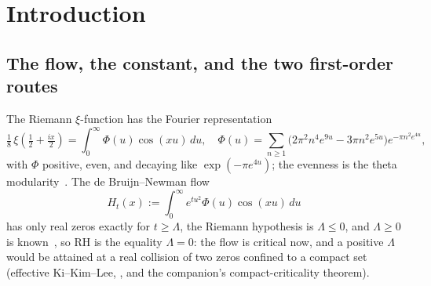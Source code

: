 \documentclass[11pt,reqno]{amsart}
\theoremstyle{plain}
\theoremstyle{definition}
\theoremstyle{remark}
\newcommand{\E}{\mathbb E}
\newcommand{\Mcal}{\mathcal M}
\DeclareMathOperator{\sgn}{sgn}
\begin{document}
\begin{abstract}
confirm the oscillation: at the surrogate collision sites
$x_*=2\gamma_1\approx28.27$ and $x_*=2\gamma_3\approx50.02$ the velocity
sign $\sgn(-M_m/M_1)$ reverses four and six times across $m\le30$, faster at
the larger site exactly as the saddle requires, and stably under the flow
$t$. The level-$p$ Clark--Ocone calculus of~\cite{Fpseudo} supplies the
rigorous language for the response-measure pairing and, more pointedly, the
reason the route cannot succeed: for the orders $p=2m\ge4$ that would have to
supply the cone there is no positive path-space law, no orthogonal chaos,
and no Laguerre--P\'olya preservation; the pseudo-process's own moments are
sign-regular, $\E[X_T^{pn}]=\tfrac{(pn)!}{n!}c_p^nT^n$, but the
\emph{arithmetic} response moments $M_m$ carry the zero's phase
$\cos(x_*u)$ and oscillate, and these are moments of different measures
between which the calculus does not transfer. The first-order even bridge
therefore closes; what survives is not a pointwise sign but a global
analytic question on the function $\Mcal(\beta)=\int_0^\infty
u^{2\beta}e^{\Lambda u^2}\Phi\cos(x_*u)\,du$, and the one even exponent that
keeps genuine positivity, the quartic $\alpha=4$ iterated-Brownian flow,
whose global real-rootedness is the surviving frontier.
\end{abstract}

\maketitle

\section{Introduction}\label{sec:intro}

\subsection*{The flow, the constant, and the two first-order routes}
The Riemann $\xi$-function has the Fourier representation
\begin{equation}\label{eq:xi-rep}
  \tfrac18\,\xi\!\left(\tfrac12+\tfrac{ix}{2}\right)
  =\int_0^\infty \Phi(u)\cos(xu)\,du,
  \quad
  \Phi(u)=\sum_{n\ge1}\bigl(2\pi^2n^4e^{9u}-3\pi n^2e^{5u}\bigr)
  e^{-\pi n^2e^{4u}},
\end{equation}
with $\Phi$ positive, even, and decaying like $\exp(-\pi e^{4u})$; the
evenness is the theta modularity~\cite{Titchmarsh,Polya27}. The de
Bruijn--Newman flow~\cite{deBruijn,Newman}
\begin{equation}\label{eq:dbn}
  H_t(x):=\int_0^\infty e^{tu^2}\Phi(u)\cos(xu)\,du
\end{equation}
has only real zeros exactly for $t\ge\Lambda$, the Riemann hypothesis is
$\Lambda\le0$, and $\Lambda\ge0$ is known~\cite{RodgersTao}, so RH is the
equality $\Lambda=0$: the flow is critical now, and a positive $\Lambda$
would be attained at a real collision of two zeros confined to a compact
set (effective Ki--Kim--Lee, \cite{Polymath15}, and the companion's
\cite{Fsymbol} compact-criticality theorem).
\end{document}
